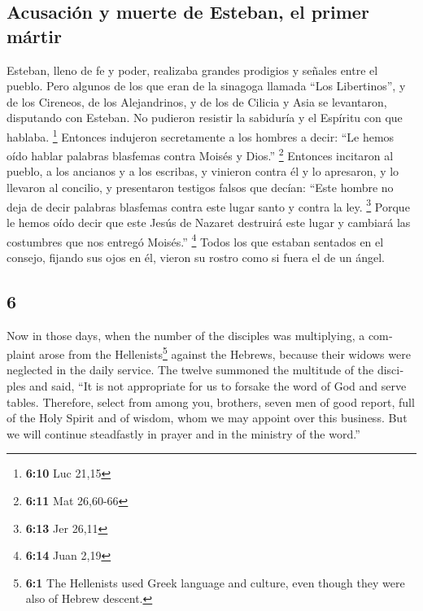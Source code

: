 \begin{paracol}{2}
\hypertarget{acusaciuxf3n-y-muerte-de-esteban-el-primer-muxe1rtir}{%
\subsection{Acusación y muerte de Esteban, el primer
mártir}\label{acusaciuxf3n-y-muerte-de-esteban-el-primer-muxe1rtir}}

 Esteban, lleno de fe y poder, realizaba grandes prodigios
y señales entre el pueblo.  Pero algunos de los que eran
de la sinagoga llamada ``Los Libertinos'', y de los Cireneos, de los
Alejandrinos, y de los de Cilicia y Asia se levantaron, disputando con
Esteban.  No pudieron resistir la sabiduría y el Espíritu
con que hablaba. \footnote{\textbf{6:10} Luc 21,15} 
Entonces indujeron secretamente a los hombres a decir: ``Le hemos oído
hablar palabras blasfemas contra Moisés y Dios.'' \footnote{\textbf{6:11}
  Mat 26,60-66}  Entonces incitaron al pueblo, a los
ancianos y a los escribas, y vinieron contra él y lo apresaron, y lo
llevaron al concilio,  y presentaron testigos falsos que
decían: ``Este hombre no deja de decir palabras blasfemas contra este
lugar santo y contra la ley. \footnote{\textbf{6:13} Jer 26,11}
 Porque le hemos oído decir que este Jesús de Nazaret
destruirá este lugar y cambiará las costumbres que nos entregó Moisés.''
\footnote{\textbf{6:14} Juan 2,19}  Todos los que estaban
sentados en el consejo, fijando sus ojos en él, vieron su rostro como si
fuera el de un ángel.

\switchcolumn
\begin{otherlanguage}{english}

\hypertarget{section-11}{%
\section{6}\label{section-11}}

 Now in those days, when the number of the disciples was
multiplying, a complaint arose from the Hellenists\footnote{\textbf{6:1}
  The Hellenists used Greek language and culture, even though they were
  also of Hebrew descent.} against the Hebrews, because their widows
were neglected in the daily service.  The twelve summoned
the multitude of the disciples and said, ``It is not appropriate for us
to forsake the word of God and serve tables.  Therefore,
select from among you, brothers, seven men of good report, full of the
Holy Spirit and of wisdom, whom we may appoint over this business.
 But we will continue steadfastly in prayer and in the
ministry of the word.''


\end{otherlanguage}
\end{paracol}
